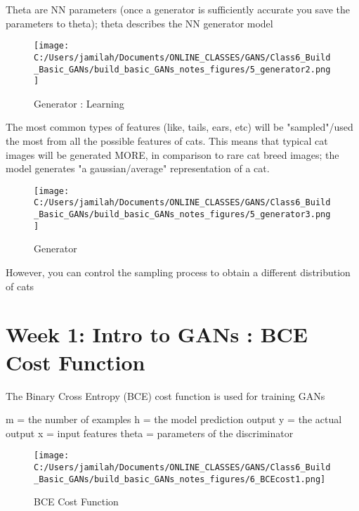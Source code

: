 \documentclass[11pt, onecolumn]{article}
\begin{document}
Theta are NN parameters (once a generator is sufficiently accurate you save the parameters to theta); theta describes the NN generator model

\begin{figure}[htp]
\begin{center}
\texttt{[image: C:/Users/jamilah/Documents/ONLINE\_CLASSES/GANS/Class6\_Build\_Basic\_GANs/build\_basic\_GANs\_notes\_figures/5\_generator2.png]}
\end{center}
\caption{Generator : Learning}
\label{5_generator2}
\end{figure}

The most common types of features (like, tails, ears, etc) will be "sampled"/used the most from all the possible features of cats.  This means that typical cat images will be generated MORE, in comparison to rare cat breed images; the model generates "a gaussian/average" representation of a cat.

\begin{figure}[htp]
\begin{center}
\texttt{[image: C:/Users/jamilah/Documents/ONLINE\_CLASSES/GANS/Class6\_Build\_Basic\_GANs/build\_basic\_GANs\_notes\_figures/5\_generator3.png]}
\end{center}
\caption{Generator}
\label{5_generator3}
\end{figure}

However, you can control the sampling process to obtain a different distribution of cats 

\section{Week 1: Intro to GANs : BCE Cost Function}

The Binary Cross Entropy (BCE) cost function is used for training GANs

m = the number of examples
h = the model prediction output
y = the actual output
x = input features
theta = parameters of the discriminator

\begin{figure}[htp]
\begin{center}
\texttt{[image: C:/Users/jamilah/Documents/ONLINE\_CLASSES/GANS/Class6\_Build\_Basic\_GANs/build\_basic\_GANs\_notes\_figures/6\_BCEcost1.png]}
\end{center}
\caption{BCE Cost Function}
\label{6_BCEcost1}
\end{figure}
\end{document}
